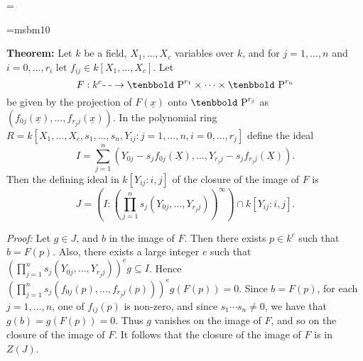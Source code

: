 
\footline={}
\bigskip

\font\tenbbold=msbm10
\def\bbP{{\hbox{\tenbbold P}}}
\def\midline#1{\raise 0.20em\hbox to #1{\vrule depth0pt height 0.405pt width #1}}
\def\dashrightarrow{\midline{0.4em} \mkern 3.6mu\midline{0.4em} \mkern -0.6mu \mathrel{\rightarrow}}
\def\qedbox{\hbox{\vbox{\hrule\hbox{\vrule\kern3pt\vbox{\kern6pt}\kern3pt\vrule}\hrule}}}%
\def\qed{\unskip\hfill\qedbox}

\noindent
{\bf Theorem:}
Let $k$ be a field,
$X_1, \ldots, X_c$ variables over $k$,
and for $j = 1, \ldots, n$ and $i = 0, \ldots, r_i$
let $f_{ij} \in k[X_1, \ldots, X_c]$.
Let
$$
F : k^c \dashrightarrow \bbP^{r_1} \times \cdots \times \bbP^{r_n}
$$
be given by the projection of $F(\underline x)$ onto $\bbP^{r_j}$
as $(f_{0j}(\underline x), \ldots, f_{r_jj}(\underline x))$.
In the polynomial ring $R = k[X_1, \ldots, X_c, s_1, \ldots, s_n, Y_{ij}: j =
1, \ldots, n, i = 0, \ldots, r_j]$
define the ideal
$$
I =
\sum_{j=1}^n (Y_{0j} - s_j f_{0j}(\underline X),
\ldots,
Y_{r_jj} - s_j f_{r_jj}(\underline X)).
$$
Then the defining ideal in $k[Y_{ij}: i, j]$
of the closure of the image of $F$ is
$$
J = \left( I : \left( \prod_{j=1}^n s_j (Y_{0j}, \ldots, Y_{r_jj})
\right)^\infty
\right)
\cap k[Y_{ij}: i, j].
$$

\noindent
{\it Proof:}
Let $g \in J$, and $b$ in the image of $F$.
Then there exists $p \in k^c$ such that $b = F(p)$.
Also,
there exists a large integer $e$ such that
$\left( \prod_{j=1}^n s_j (Y_{0j}, \ldots, Y_{r_jj})
\right)^e g \subseteq I$.
Hence
$\left( \prod_{j=1}^n s_j (f_{0j}(p), \ldots, f_{r_jj}(p)) \right)^e g(F(p))
= 0$.
Since $b = F(p)$,
for each $j = 1, \ldots, n$,
one of $f_{ij}(p)$ is non-zero,
and since $s_1 \cdots s_n \not = 0$,
we have that $g(b) = g(F(p)) = 0$.
Thus $g$ vanishes on the image of $F$,
and so on the closure of the image of $F$.
It follows that the closure of the image of $F$ is in $Z(J)$.

